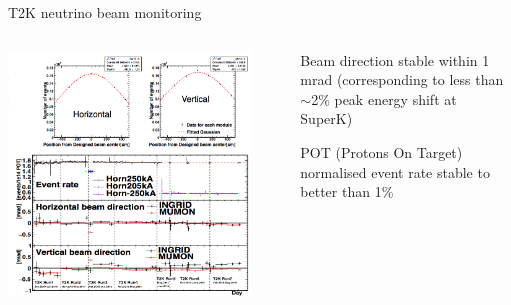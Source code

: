 %
%
\begin{frame}{T2K neutrino beam monitoring}

\begin{columns}
  \begin{column}{0.65\textwidth}
   \begin{center}
    \includegraphics[width=0.90\textwidth]{./images/3nu/accelerator/t2k/beam_monitoring}\\
   \end{center}
  \end{column}
  \begin{column}{0.35\textwidth}
    \begin{itemize}
      {\small
      \item Beam direction stable within 1 mrad (corresponding to less than $\sim$2\% peak energy shift at SuperK)
      \item POT (Protons On Target) normalised event rate stable to better than 1\%
      }
    \end{itemize}
  \end{column}
\end{columns}
\end{frame}


